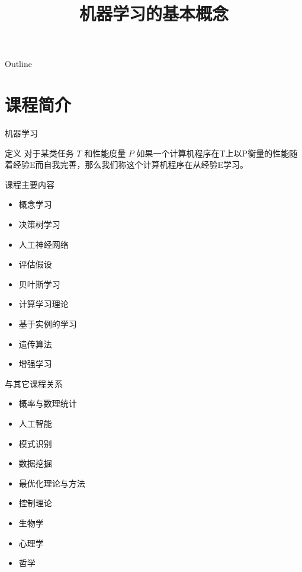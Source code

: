 \documentclass[presentation]{beamer}
\date{}
\title{机器学习的基本概念}
\begin{document}
\maketitle
\begin{frame}{Outline}
\tableofcontents
\end{frame}











\section{课程简介}
\label{sec:org8485193}
\begin{frame}[label={sec:org3498d77}]{机器学习}
\begin{block}{定义}
对于某类任务 \(T\) 和性能度量 \(P\) 如果一个计算机程序在T上以P衡量的性能随着经验E而自我完善，那么我们称这个计算机程序在从经验E学习。
\end{block}
\end{frame}

\begin{frame}[label={sec:org543924b}]{课程主要内容}
\begin{itemize}
\item 概念学习
\item 决策树学习
\item 人工神经网络
\item 评估假设
\item 贝叶斯学习
\item 计算学习理论
\item 基于实例的学习
\item 遗传算法
\item 增强学习
\end{itemize}
\end{frame}

\begin{frame}[label={sec:orgbce960c}]{与其它课程关系}
\begin{itemize}
\item 概率与数理统计
\item 人工智能
\item 模式识别
\item 数据挖掘
\item 最优化理论与方法
\item 控制理论
\item 生物学
\item 心理学
\item 哲学
\end{itemize}
\end{frame}
\end{document}
